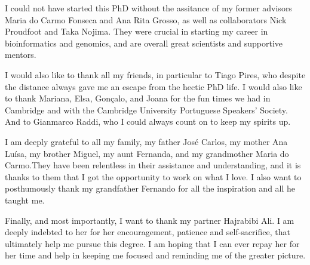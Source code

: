 \begin{acknowledgements}
I could not have started this PhD without the assitance of my former advisors Maria do Carmo Fonseca and Ana Rita Grosso, as well as collaborators Nick Proudfoot and Taka Nojima. They were crucial in starting my career in bioinformatics and genomics, and are overall great scientists and supportive mentors.

I would also like to thank all my friends, in particular to Tiago Pires, who despite the distance always gave me an escape from the hectic PhD life. I would also like to thank Mariana, Elsa, Gonçalo, and Joana for the fun times we had in Cambridge and with the Cambridge University Portuguese Speakers' Society. And to Gianmarco Raddi, who I could always count on to keep my spirits up.

I am deeply grateful to all my family, my father José Carlos, my mother Ana Luísa, my brother Miguel, my aunt Fernanda, and my grandmother Maria do Carmo.They have been relentless in their assistance and understanding, and it is thanks to them that I got the opportunity to work on what I love. I also want to posthumously thank my grandfather Fernando for all the inspiration and all he taught me.

Finally, and most importantly, I want to thank my partner Hajrabibi Ali. I am deeply indebted to her for her encouragement, patience and self-sacrifice, that ultimately help me pursue this degree. I am hoping that I can ever repay her for her time and help in keeping me focused and reminding me of the greater picture.

\end{acknowledgements}
